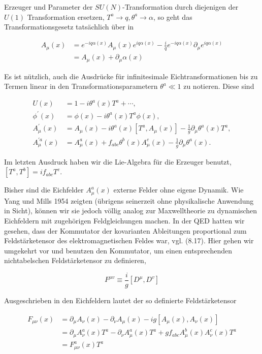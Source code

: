\documentclass[10pt, letterpaper]{article}
\begin{document}
Erzeuger und Parameter der $S U(N)$-Transformation durch diejenigen der $U(1)$ Transformation ersetzen, $T^{a} \rightarrow q, \theta^{a} \rightarrow \alpha$, so geht das Transformationsgesetz tatsächlich über in

$$
\begin{aligned}
A_{\mu}(x) & =e^{-i q \alpha(x)} A_{\mu}(x) e^{i q \alpha(x)}-\frac{i}{q} e^{-i q \alpha(x)} \partial_{\mu} e^{i q \alpha(x)} \\
& =A_{\mu}(x)+\partial_{\mu} \alpha(x)
\end{aligned}
$$

Es ist nützlich, auch die Ausdrücke für infinitesimale Eichtransformationen bis zu Termen linear in den Transformationsparametern $\theta^{a} \ll 1$ zu notieren. Diese sind

$$
\begin{aligned}
U(x) & =1-i \theta^{a}(x) T^{a}+\cdots, \\
\phi^{\prime}(x) & =\phi(x)-i \theta^{a}(x) T^{a} \phi(x), \\
A_{\mu}^{\prime}(x) & =A_{\mu}(x)-i \theta^{a}(x)\left[T^{a}, A_{\mu}(x)\right]-\frac{1}{g} \partial_{\mu} \theta^{a}(x) T^{a}, \\
A_{\mu}^{\prime a}(x) & =A_{\mu}^{a}(x)+f_{a b c} \theta^{b}(x) A_{\mu}^{c}(x)-\frac{1}{g} \partial_{\mu} \theta^{a}(x) .
\end{aligned}
$$

Im letzten Ausdruck haben wir die Lie-Algebra für die Erzeuger benutzt, $\left[T^{a}, T^{b}\right]= i f_{a b c} T^{c}$.

Bisher sind die Eichfelder $A_{\mu}^{a}(x)$ externe Felder ohne eigene Dynamik. Wie Yang und Mills 1954 zeigten (übrigens seinerzeit ohne physikalische Anwendung in Sicht), können wir sie jedoch völlig analog zur Maxwelltheorie zu dynamischen Eichfeldern mit zugehörigen Feldgleichungen machen. In der QED hatten wir gesehen, dass der Kommutator der kovarianten Ableitungen proportional zum Feldstärketensor des elektromagnetischen Feldes war, vgl. (8.17). Hier gehen wir umgekehrt vor und benutzen den Kommutator, um einen entsprechenden nichtabelschen Feldstärketensor zu definieren,

$$
F^{\mu v} \equiv \frac{i}{g}\left[D^{\mu}, D^{v}\right]
$$

Ausgeschrieben in den Eichfeldern lautet der so definierte Feldstärketensor

$$
\begin{aligned}
F_{\mu \nu}(x) & =\partial_{\mu} A_{\nu}(x)-\partial_{\nu} A_{\mu}(x)-i g\left[A_{\mu}(x), A_{\nu}(x)\right] \\
& =\partial_{\mu} A_{\nu}^{a}(x) T^{a}-\partial_{\nu} A_{\mu}^{a}(x) T^{a}+g f_{a b c} A_{\mu}^{b}(x) A_{\nu}^{c}(x) T^{a} \\
& =F_{\mu \nu}^{a}(x) T^{a}
\end{aligned}
$$
\end{document}
